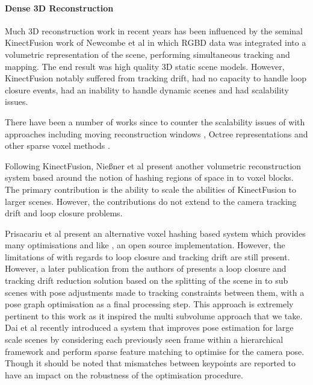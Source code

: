 \paragraph{Dense 3D Reconstruction}
Much 3D reconstruction work in recent years has been influenced by the seminal KinectFusion work \cite{Newcombe2011} of Newcombe et al in which
RGBD data was integrated into a volumetric representation of the scene, performing simultaneous tracking and mapping. The end result was
high quality 3D static scene models. 
However, KinectFusion notably suffered from tracking drift, had no capacity to handle loop closure events, had an inability to handle dynamic scenes 
and had scalability issues.

There have been a number of works since to counter the scalability issues of \cite{Newcombe2011} with approaches including moving reconstruction 
windows \cite{Roth2012, Whelan2012}, Octree representations \cite{Zeng2012} and other sparse voxel methods \cite{Prisacariu2014, Chen2013}.

Following KinectFusion, Nie{\ss}ner et al present another volumetric reconstruction system \cite{Niessner2013} based around the notion of
hashing regions of space in to voxel blocks. The primary contribution is the ability to scale the abilities of KinectFusion to larger
scenes. However, the contributions do not extend to the camera tracking drift and loop closure problems.

Prisacariu et al present an alternative voxel hashing based system \cite{Prisacariu2014} which provides many optimisations and like \cite{Niessner2013}, an open source 
implementation. However, the limitations of \cite{Newcombe2011,Niessner2013} with regards to loop closure and tracking drift are still present. 
However, a later publication \cite{Kahler2016} from the authors of \cite{Prisacariu2014} presents a loop closure and tracking drift reduction 
solution based on the splitting of the scene in to sub scenes with pose adjustments made to tracking constraints between them, with 
a pose graph optimisation as a final processing step. This approach is extremely pertinent to this work as it inspired the multi subvolume approach 
that we take. Dai et al \cite{dai2016bundlefusion} recently introduced a system that improves pose estimation for large scale scenes by considering each previously seen 
frame within a hierarchical framework and perform sparse feature matching to optimise for the camera pose. Though it should be noted that mismatches between keypoints are 
reported to have an impact on the robustness of the optimisation procedure.

